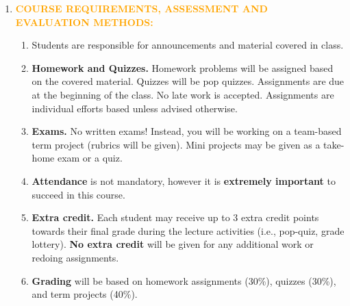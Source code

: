 \documentclass{article}
\begin{document}
\begin{enumerate}
\item \textcolor{orange}{\bf COURSE REQUIREMENTS, ASSESSMENT AND EVALUATION METHODS:} 

\begin{enumerate}


\item Students are responsible for announcements and material covered
  in class.


\item {\bf Homework and Quizzes.} Homework problems will be assigned
   based on the covered material. Quizzes will be pop quizzes. 
Assignments are due at the beginning of the class. No late work is accepted. Assignments are individual efforts based unless advised otherwise.  
  

\item {\bf Exams.} No written exams! Instead, you will be working on a team-based term project (rubrics will be given).
 Mini projects may be given as a take-home exam or a quiz. 


\item {\bf Attendance} is not mandatory, however it is {\bf extremely important} to succeed in this course.

\item {\bf Extra credit. } Each student may receive up to 3 extra
  credit points towards their final grade during the lecture activities
  (i.e., pop-quiz, grade lottery).  {\bf No extra credit} will be given for
  any additional work or redoing assignments.

\item {\bf Grading } will be based on homework assignments (30\%), quizzes (30\%), and term projects (40\%). 







\end{enumerate}
\end{enumerate}
\end{document}
